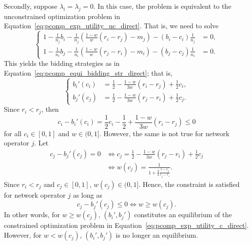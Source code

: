 Secondly, suppose $\lambda_i=\lambda_j=0$. In this case, the problem is equivalent to the unconstrained optimization problem in Equation~\eqref{eq:pcomp_exp_utility_uc_direct}. That is, we need to solve
\begin{equation*}
	\left\{
	\begin{array}{ll}
		1 - \displaystyle\frac{1}{n_j}b_i - \displaystyle\frac{1}{n_j}\left( \displaystyle\frac{1-w}{w}(r_i-r_j) - m_j \right) - (b_i-c_i)\displaystyle\frac{1}{n_j} &= 0,\\[2ex]
		1 - \displaystyle\frac{1}{n_i}b_j - \displaystyle\frac{1}{n_i}\left( \displaystyle\frac{1-w}{w}(r_j-r_i) - m_i \right) - (b_j-c_j)\displaystyle\frac{1}{n_i} &= 0.
	\end{array}
	\right.
\end{equation*}
This yields the bidding strategies as in Equation~\eqref{eq:pcomp_equi_bidding_str_direct}; that is,
\begin{equation*}
	\left\{
	\begin{array}{ll}
		b_i'(c_i) &= \displaystyle\frac{1}{2} - \displaystyle\frac{1-w}{3w}(r_i-r_j) + \displaystyle\frac{1}{2}c_i,\\[2ex]
		b_j'(c_j) &= \displaystyle\frac{1}{2} - \displaystyle\frac{1-w}{3w}(r_j-r_i) + \displaystyle\frac{1}{2}c_j.
	\end{array}
	\right.
\end{equation*}
Since $r_i < r_j$, then
\begin{equation*}
	c_i - b_i'(c_i) = \frac{1}{2}c_i - \frac{1}{2} + \frac{1-w}{3w}(r_i-r_j) \le 0
\end{equation*}
for all $c_i\in[0,1]$ and $w\in(0,1]$. However, the same is not true for network operator $j$. Let
\begin{align*}
	c_j - b_j'(c_j) = 0 &\iff c_j = \frac{1}{2} - \frac{1-w}{3w}(r_j-r_i) + \frac{1}{2}c_j\\[2ex]
	&\iff w(c_j) = \frac{1}{1 + \frac{3}{2}\frac{1-c_j}{r_j-r_i}}.
\end{align*}
Since $r_i < r_j$ and $c_j\in[0,1]$, $w(c_j)\in(0,1]$. Hence, the constraint is satisfied for network operator $j$ as long as
\begin{equation*}
	c_j-b_j'(c_j) \le 0 \iff w \ge w(c_j).
\end{equation*}
In other words, for $w\ge w(c_j)$, $(b_i',b_j')$ constitutes an equilibrium of the constrained optimization problem in Equation~\eqref{eq:pcomp_exp_utility_c_direct}. However, for $w < w(c_j)$, $(b_i', b_j')$ is no longer an equilibrium.

